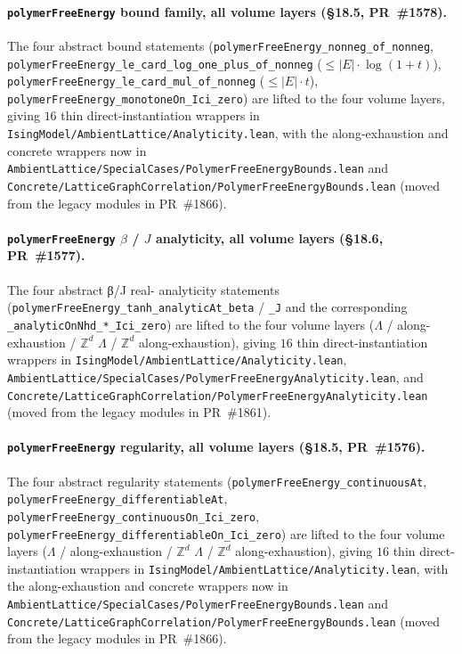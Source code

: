 \documentclass[a4paper,11pt]{article}
\begin{document}
\paragraph{\texttt{polymerFreeEnergy} bound family, all volume layers
(\S18.5, PR~\#1578).} The four abstract bound statements
(\texttt{polymerFreeEnergy\_nonneg\_of\_nonneg},
\texttt{polymerFreeEnergy\_le\_card\_log\_one\_plus\_of\_nonneg}
($\le |E| \cdot \log(1+t)$),
\texttt{polymerFreeEnergy\_le\_card\_mul\_of\_nonneg}
($\le |E| \cdot t$),
\texttt{polymerFreeEnergy\_monotoneOn\_Ici\_zero}) are lifted to
the four volume layers, giving $16$ thin direct-instantiation
wrappers in
\texttt{IsingModel/AmbientLattice/Analyticity.lean}, with the
along-exhaustion and concrete wrappers now in
\texttt{AmbientLattice/SpecialCases/PolymerFreeEnergyBounds.lean} and
\texttt{Concrete/LatticeGraphCorrelation/PolymerFreeEnergyBounds.lean}
(moved from the legacy modules in PR~\#1866).

\paragraph{\texttt{polymerFreeEnergy} $\beta$ / $J$ analyticity, all
volume layers (\S18.6, PR~\#1577).} The four abstract β/J real-
analyticity statements (\texttt{polymerFreeEnergy\_tanh\_analyticAt\_beta}
/ \texttt{\_J} and the corresponding \texttt{\_analyticOnNhd\_*\_Ici\_zero})
are lifted to the four volume layers ($\Lambda$ /
along-exhaustion / $\mathbb{Z}^d$ $\Lambda$ / $\mathbb{Z}^d$
along-exhaustion), giving $16$ thin direct-instantiation wrappers
in \texttt{IsingModel/AmbientLattice/Analyticity.lean},
\texttt{AmbientLattice/SpecialCases/PolymerFreeEnergyAnalyticity.lean},
and
\texttt{Concrete/LatticeGraphCorrelation/PolymerFreeEnergyAnalyticity.lean}
(moved from the legacy modules in PR~\#1861).

\paragraph{\texttt{polymerFreeEnergy} regularity, all volume layers
(\S18.5, PR~\#1576).} The four abstract regularity statements
(\texttt{polymerFreeEnergy\_continuousAt},
\texttt{polymerFreeEnergy\_differentiableAt},
\texttt{polymerFreeEnergy\_continuousOn\_Ici\_zero},
\texttt{polymerFreeEnergy\_differentiableOn\_Ici\_zero}) are lifted
to the four volume layers ($\Lambda$ / along-exhaustion /
$\mathbb{Z}^d$ $\Lambda$ / $\mathbb{Z}^d$ along-exhaustion), giving
$16$ thin direct-instantiation wrappers in
\texttt{IsingModel/AmbientLattice/Analyticity.lean}, with the
along-exhaustion and concrete wrappers now in
\texttt{AmbientLattice/SpecialCases/PolymerFreeEnergyBounds.lean} and
\texttt{Concrete/LatticeGraphCorrelation/PolymerFreeEnergyBounds.lean}
(moved from the legacy modules in PR~\#1866).
\end{document}
